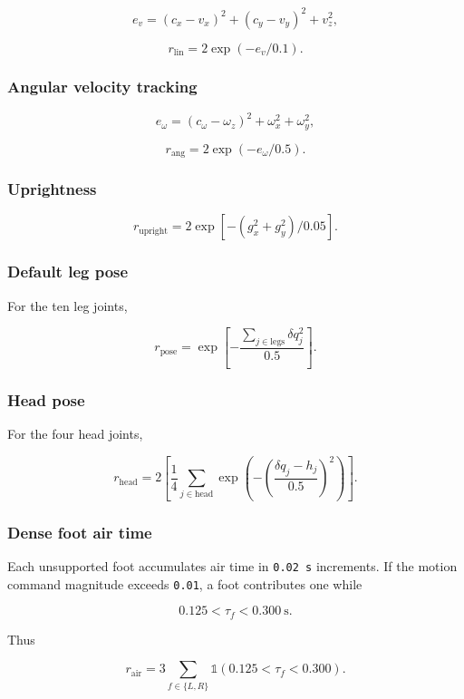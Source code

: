 \documentclass[
  american,
  11pt,
  letterpaper,
]{article}
\begin{document}
\[
e_v=(c_x-v_x)^2+(c_y-v_y)^2+v_z^2,
\]

\[
r_{\text{lin}}=2\exp(-e_v/0.1).
\]

\subsubsection{Angular velocity
tracking}\label{angular-velocity-tracking}

\[
e_\omega=(c_\omega-\omega_z)^2+\omega_x^2+\omega_y^2,
\]

\[
r_{\text{ang}}=2\exp(-e_\omega/0.5).
\]

\subsubsection{Uprightness}\label{uprightness}

\[
r_{\text{upright}}
=2\exp[-(g_x^2+g_y^2)/0.05].
\]

\subsubsection{Default leg pose}\label{default-leg-pose}

For the ten leg joints,

\[
r_{\text{pose}}
=\exp\left[
-\frac{\sum_{j\in\text{legs}}\delta q_j^2}{0.5}
\right].
\]

\subsubsection{Head pose}\label{head-pose}

For the four head joints,

\[
r_{\text{head}}
=2\left[
\frac14\sum_{j\in\text{head}}
\exp\left(-\left(\frac{\delta q_j-h_j}{0.5}\right)^2\right)
\right].
\]

\subsubsection{Dense foot air time}\label{dense-foot-air-time}

Each unsupported foot accumulates air time in \texttt{0.02\ s}
increments. If the motion command magnitude exceeds \texttt{0.01}, a
foot contributes one while

\[
0.125<\tau_f<0.300\ \text{s}.
\]

Thus

\[
r_{\text{air}}
=3\sum_{f\in\{L,R\}}
\mathbb 1(0.125<\tau_f<0.300).
\]
\end{document}

